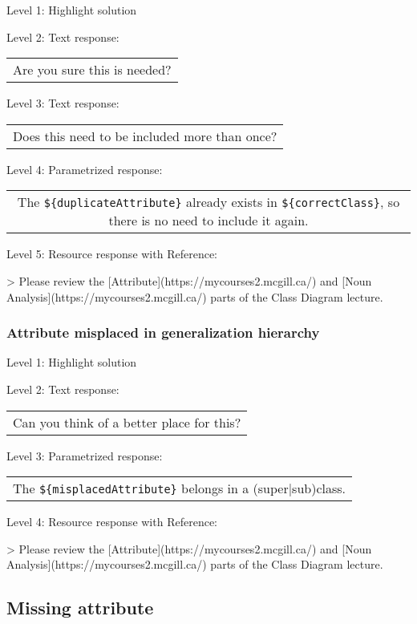 \noindent Level 1: Highlight solution \medskip

\noindent Level 2: Text response: \medskip

\begin{tabular}{|c}
Are you sure this is needed?
\end{tabular} \medskip

\noindent Level 3: Text response: \medskip

\begin{tabular}{|c}
Does this need to be included more than once?
\end{tabular} \medskip

\noindent Level 4: Parametrized response: \medskip

\begin{tabular}{|c}
The \verb|${duplicateAttribute}| already exists in \verb|${correctClass}|, so there is no need to include it again.
\end{tabular} \medskip

\noindent Level 5: Resource response with Reference:

> Please review the [Attribute](https://mycourses2.mcgill.ca/) and [Noun Analysis](https://mycourses2.mcgill.ca/) parts of the Class Diagram lecture.


\subsubsection{Attribute misplaced in generalization hierarchy}

\noindent Level 1: Highlight solution \medskip

\noindent Level 2: Text response: \medskip

\begin{tabular}{|c}
Can you think of a better place for this?
\end{tabular} \medskip

\noindent Level 3: Parametrized response: \medskip

\begin{tabular}{|c}
The \verb|${misplacedAttribute}| belongs in a (super|sub)class.
\end{tabular} \medskip

\noindent Level 4: Resource response with Reference:

> Please review the [Attribute](https://mycourses2.mcgill.ca/) and [Noun Analysis](https://mycourses2.mcgill.ca/) parts of the Class Diagram lecture.


\subsection{Missing attribute}


